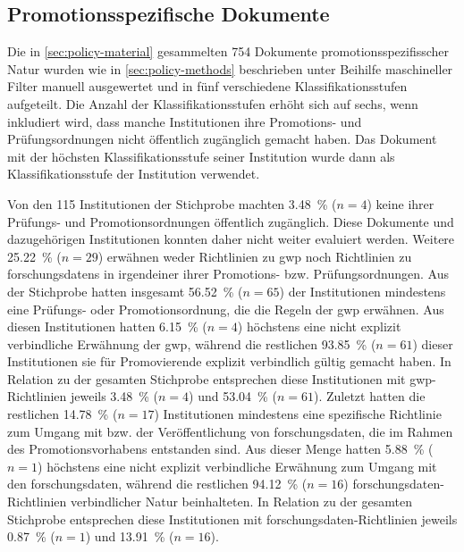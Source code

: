 \subsection{Promotionsspezifische Dokumente}\label{sec:policy-results-specific}
Die in \cref{sec:policy-material} gesammelten \num{754} Dokumente promotionsspezifisscher Natur wurden wie in \cref{sec:policy-methods} beschrieben unter Beihilfe maschineller Filter manuell ausgewertet und in fünf verschiedene Klassifikationsstufen aufgeteilt.
Die Anzahl der Klassifikationsstufen erhöht sich auf sechs, wenn inkludiert wird, dass manche Institutionen ihre Promotions- und Prüfungsordnungen nicht öffentlich zugänglich gemacht haben.
Das Dokument mit der höchsten Klassifikationsstufe seiner Institution wurde dann als Klassifikationsstufe der Institution verwendet.

Von den \num{115} Institutionen der Stichprobe machten \SI{3,48}{\percent} ($n=\num{4}$) keine ihrer Prüfungs- und Promotionsordnungen öffentlich zugänglich.
Diese Dokumente und dazugehörigen Institutionen konnten daher nicht weiter evaluiert werden.
Weitere \SI{25,22}{\percent} ($n=\num{29}$) erwähnen weder Richtlinien zu \gls{gwp} noch Richtlinien zu \glspl{forschungsdaten} in irgendeiner ihrer Promotions- bzw. Prüfungsordnungen.
Aus der Stichprobe hatten insgesamt \SI{56,52}{\percent} ($n=\num{65}$) der Institutionen mindestens eine Prüfungs- oder Promotionsordnung, die die Regeln der \gls{gwp} erwähnen.
Aus diesen Institutionen hatten \SI{6,15}{\percent} ($n=\num{4}$) höchstens eine nicht explizit verbindliche Erwähnung der \gls{gwp}, während die restlichen \SI{93,85}{\percent} ($n=\num{61}$) dieser Institutionen sie für Promovierende explizit verbindlich gültig gemacht haben.
In Relation zu der gesamten Stichprobe entsprechen diese Institutionen mit \gls{gwp}-Richtlinien jeweils \SI{3,48}{\percent} ($n=\num{4}$) und \SI{53,04}{\percent} ($n=\num{61}$).
Zuletzt hatten die restlichen \SI{14,78}{\percent} ($n=\num{17}$) Institutionen mindestens eine spezifische Richtlinie zum Umgang mit bzw. der Veröffentlichung von \gls{forschungsdaten}, die im Rahmen des Promotionsvorhabens entstanden sind.
Aus dieser Menge hatten \SI{5,88}{\percent} ($n=\num{1}$) höchstens eine nicht explizit verbindliche Erwähnung zum Umgang mit den \gls{forschungsdaten}, während die restlichen \SI{94,12}{\percent} ($n=\num{16}$) \gls{forschungsdaten}-Richtlinien verbindlicher Natur beinhalteten.
In Relation zu der gesamten Stichprobe entsprechen diese Institutionen mit \gls{forschungsdaten}-Richtlinien jeweils \SI{0,87}{\percent} ($n=\num{1}$) und \SI{13,91}{\percent} ($n=\num{16}$).

